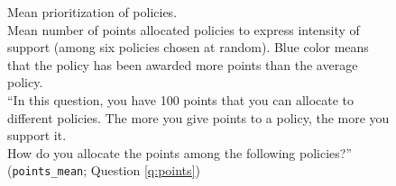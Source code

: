 \begin{figure}[h!] 
    \cprotect\caption[Mean prioritization of policies]{Mean prioritization of policies. \\Mean number of points allocated policies to express intensity of support (among six policies chosen at random). Blue color means that the policy has been awarded more points than the average policy. \\ ``In this question, you have 100 points that you can allocate to different policies. The more you give points to a policy, the more you support it. \\ How do you allocate the points among the following policies?'' (\verb|points_mean|; Question \ref{q:points})}\label{fig:points}
\end{figure}

